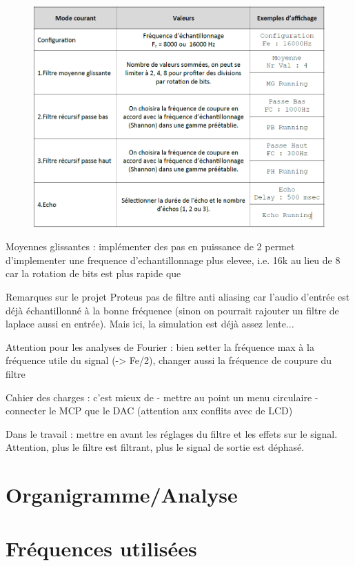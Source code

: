 \documentclass{article}
\begin{document}
    
    \begin{figure}[H]
        \centering
        \includegraphics[width=.7\textwidth]{./images/menus.png}
    \end{figure}


    Moyennes glissantes : implémenter des pas en puissance de 2 permet d'implementer une frequence d'echantillonnage plus elevee, i.e. 16k au lieu de 8 car la rotation de bits est plus rapide que 

    Remarques sur le projet Proteus
    pas de filtre anti aliasing car l'audio d'entrée est déjà échantillonné à la bonne fréquence (sinon on pourrait rajouter un filtre de laplace aussi en entrée). Mais ici, la simulation est déjà assez lente...

    Attention pour les analyses de Fourier : bien setter la fréquence max à la fréquence utile du signal (-> Fe/2), changer aussi la fréquence de coupure du filtre


    Cahier des charges : c'est mieux de
    - mettre au point un menu circulaire
    - connecter le MCP que le DAC (attention aux conflits avec de LCD)

    Dans le travail : mettre en avant les réglages du filtre et les effets sur le signal. Attention, plus le filtre est filtrant, plus le signal de sortie est déphasé.

    \section{Organigramme/Analyse}

    \section{Fréquences utilisées}
\end{document}
